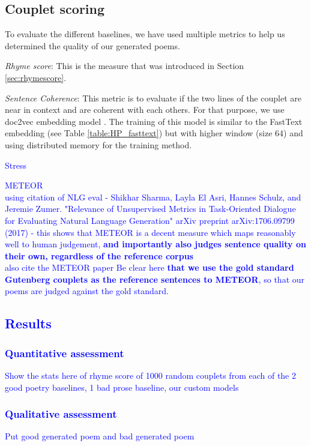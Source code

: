 \documentclass[11pt,a4paper]{article}
\begin{document}
\subsection{Couplet scoring}
\label{sec:coupletscore}
To evaluate the different baselines, we have used multiple metrics to help us determined the quality of our generated poems.

\begin{itemize}
	\item \textit{Rhyme score}: This is the measure that was introduced in Section \ref{sec:rhymescore}.
	\item \textit{Sentence Coherence}: This metric is to evaluate if the two lines of the couplet are near in context and are coherent with each others. For that purpose, we use doc2vec embedding model \cite{docvec}. The training of this model is similar to the FastText embedding (see Table \ref{table:HP_fasttext}) but with higher window (size 64) and using distributed memory for the training method.
\textcolor{blue}{
	\item Stress 
	\item METEOR\\
		using citation of NLG eval - Shikhar Sharma, Layla El Asri, Hannes Schulz, and Jeremie Zumer. "Relevance of Unsupervised Metrics in Task-Oriented Dialogue for Evaluating Natural Language Generation" arXiv preprint arXiv:1706.09799 (2017) - this shows that METEOR is a decent measure which maps reasonably well to human judgement, \textbf{and importantly also judges sentence quality on their own, regardless of the reference corpus}\\
		also cite the METEOR paper
		Be clear here \textbf{that we use the gold standard Gutenberg couplets as the reference sentences to METEOR}, so that our poems are judged against the gold standard.
}
\end{itemize}



\textcolor{blue}{
\subsection{Results}
\label{sec:results}
\subsubsection{Quantitative assessment}
Show the stats here of rhyme score of 1000 random couplets from each of the 2 good poetry baselines, 1 bad prose baseline, our custom models
\subsubsection{Qualitative assessment}
Put good generated poem and bad generated poem
}
\end{document}

